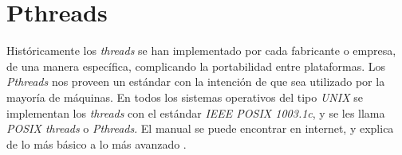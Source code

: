 

\section{Pthreads}
\label{appendix:pthread}

Históricamente los \textit{threads} se han implementado por cada fabricante o empresa, de una manera específica, complicando la portabilidad entre plataformas. Los \textit{Pthreads} nos proveen un estándar con la intención de que sea utilizado por la mayoría de máquinas. En todos los sistemas operativos del tipo \textit{UNIX} se implementan los \textit{threads} con el estándar \textit{IEEE POSIX 1003.1c}, y se les llama \textit{POSIX threads} o \textit{Pthreads}. El manual se puede encontrar en internet, y explica de lo más básico a lo más avanzado \cite{barney2009posix}.
\bigskip











